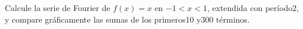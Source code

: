 Calcule la serie de Fourier de $f(x)=x$ en $-1<x<1$, extendida con período2, y compare gráficamente las sumas de los primeros10 y300 términos.
